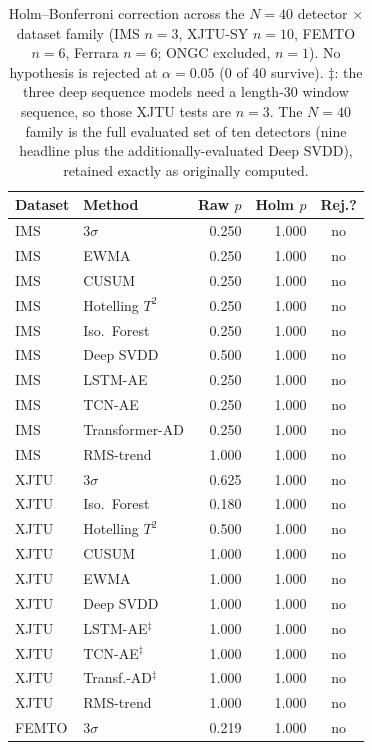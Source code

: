 \documentclass[IJPHM, 2026, 0]{PHMSociety}
\begin{document}
\begin{table}[t] \small
	\begin{center}
	\caption{Holm--Bonferroni correction across the $N=40$ detector $\times$ dataset family (IMS $n=3$, XJTU-SY $n=10$, FEMTO $n=6$, Ferrara $n=6$; ONGC excluded, $n=1$). No hypothesis is rejected at $\alpha=0.05$ (0 of 40 survive). $\ddagger$: the three deep sequence models need a length-30 window sequence, so those XJTU tests are $n=3$. The $N=40$ family is the full evaluated set of ten detectors (nine headline plus the additionally-evaluated Deep SVDD), retained exactly as originally computed.}
	\label{tab:holm}
	\begin{tabular}{l l r r c}
		\hline \hline
		\textbf{Dataset} & \textbf{Method} & \textbf{Raw $p$} & \textbf{Holm $p$} & \textbf{Rej.?} \\
		\hline
		IMS & $3\sigma$ & 0.250 & 1.000 & no \\
		IMS & EWMA & 0.250 & 1.000 & no \\
		IMS & CUSUM & 0.250 & 1.000 & no \\
		IMS & Hotelling $T^2$ & 0.250 & 1.000 & no \\
		IMS & Iso.\ Forest & 0.250 & 1.000 & no \\
		IMS & Deep SVDD & 0.500 & 1.000 & no \\
		IMS & LSTM-AE & 0.250 & 1.000 & no \\
		IMS & TCN-AE & 0.250 & 1.000 & no \\
		IMS & Transformer-AD & 0.250 & 1.000 & no \\
		IMS & RMS-trend & 1.000 & 1.000 & no \\
		XJTU & $3\sigma$ & 0.625 & 1.000 & no \\
		XJTU & Iso.\ Forest & 0.180 & 1.000 & no \\
		XJTU & Hotelling $T^2$ & 0.500 & 1.000 & no \\
		XJTU & CUSUM & 1.000 & 1.000 & no \\
		XJTU & EWMA & 1.000 & 1.000 & no \\
		XJTU & Deep SVDD & 1.000 & 1.000 & no \\
		XJTU & LSTM-AE$^\ddagger$ & 1.000 & 1.000 & no \\
		XJTU & TCN-AE$^\ddagger$ & 1.000 & 1.000 & no \\
		XJTU & Transf.-AD$^\ddagger$ & 1.000 & 1.000 & no \\
		XJTU & RMS-trend & 1.000 & 1.000 & no \\
		FEMTO & $3\sigma$ & 0.219 & 1.000 & no \\

\end{tabular}
\end{center}
\end{table}
\end{document}
